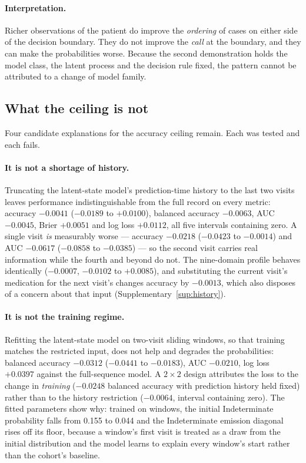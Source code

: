 \documentclass[11pt]{article}
\begin{document}
\paragraph{Interpretation.} Richer observations of the patient do improve the
\emph{ordering} of cases on either side of the decision boundary. They do not
improve the \emph{call} at the boundary, and they can make the probabilities
worse. Because the second demonstration holds the model class, the latent process
and the decision rule fixed, the pattern cannot be attributed to a change of
model family.

\subsection{What the ceiling is not}
\label{sec:ceiling}

Four candidate explanations for the accuracy ceiling remain. Each was tested and
each fails.

\paragraph{It is not a shortage of history.} Truncating the latent-state model's
prediction-time history to the last two visits leaves performance
indistinguishable from the full record on every metric: accuracy $-0.0041$
($-0.0189$ to $+0.0100$), balanced accuracy $-0.0063$, AUC $-0.0045$, Brier
$+0.0051$ and log loss $+0.0112$, all five intervals containing zero. A single
visit \emph{is} measurably worse --- accuracy $-0.0218$ ($-0.0423$ to $-0.0014$)
and AUC $-0.0617$ ($-0.0858$ to $-0.0385$) --- so the second visit carries real
information while the fourth and beyond do not. The nine-domain profile behaves
identically ($-0.0007$, $-0.0102$ to $+0.0085$), and substituting the current
visit's medication for the next visit's changes accuracy by $-0.0013$, which also
disposes of a concern about that input (Supplementary~\ref{sup:history}).

\paragraph{It is not the training regime.} Refitting the latent-state model on
two-visit sliding windows, so that training matches the restricted input, does
not help and degrades the probabilities: balanced accuracy $-0.0312$ ($-0.0441$
to $-0.0183$), AUC $-0.0210$, log loss $+0.0397$ against the full-sequence model.
A $2\times2$ design attributes the loss to the change in \emph{training}
($-0.0248$ balanced accuracy with prediction history held fixed) rather than to
the history restriction ($-0.0064$, interval containing zero). The fitted
parameters show why: trained on windows, the initial Indeterminate probability
falls from 0.155 to 0.044 and the Indeterminate emission diagonal rises off its
floor, because a window's first visit is treated as a draw from the initial
distribution and the model learns to explain every window's start rather than the
cohort's baseline.
\end{document}
